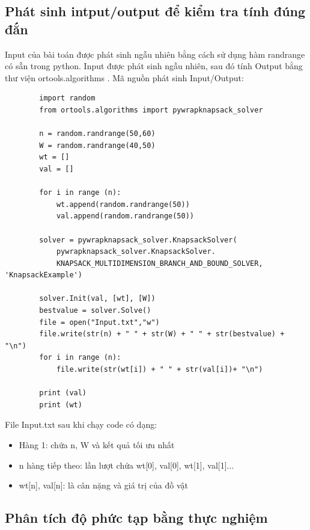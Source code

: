 \documentclass[12pt,a4paper]{report}
\begin{document}
    \subsection{Phát sinh intput/output để kiểm tra tính đúng đắn}
    Input của bài toán được phát sinh ngẫu nhiên bằng cách sử dụng hàm randrange có
    sẵn trong python. Input được phát sinh ngẫu nhiên, sau đó tính Output bằng 
    thư viện ortools.algorithms . Mã nguồn phát sinh Input/Output:
    \begin{lstlisting}
        import random
        from ortools.algorithms import pywrapknapsack_solver
        
        n = random.randrange(50,60)
        W = random.randrange(40,50)
        wt = []
        val = []
        
        for i in range (n):
            wt.append(random.randrange(50))
            val.append(random.randrange(50))
        
        solver = pywrapknapsack_solver.KnapsackSolver(
            pywrapknapsack_solver.KnapsackSolver.
            KNAPSACK_MULTIDIMENSION_BRANCH_AND_BOUND_SOLVER, 'KnapsackExample')
        
        solver.Init(val, [wt], [W])
        bestvalue = solver.Solve()
        file = open("Input.txt","w")
        file.write(str(n) + " " + str(W) + " " + str(bestvalue) + "\n")
        for i in range (n):
            file.write(str(wt[i]) + " " + str(val[i])+ "\n")
        
        print (val)
        print (wt)
    \end{lstlisting}
    File Input.txt sau khi chạy code có dạng:
    \begin{itemize}
        \item Hàng 1: chứa n, W và kết quả tối ưu nhất
        \item n hàng tiếp theo: lần lượt chứa wt[0], val[0], wt[1], val[1]... 
        \item wt[n], val[n]: là cân nặng và giá trị của đồ vật
    \end{itemize}
    \subsection{Phân tích độ phức tạp bằng thực nghiệm}
\end{document}
